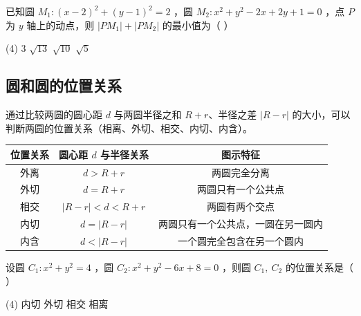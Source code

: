 \begin{example}
    已知圆 $M_1:(x-2)^2+(y-1)^2=2$ ，圆 $M_2: x^2+y^2-2 x+2 y+1=0$ ，点 $P$ 为 $y$ 轴上的动点，则 $|P M_1|+|P M_2|$ 的最小值为（ \hspace{2em} ）
    \begin{tasks}(4)
        \task $3$
        \task $\sqrt{13}$
        \task $\sqrt{10}$
        \task $\sqrt{5}$
    \end{tasks}
\end{example}

\subsection{圆和圆的位置关系}

\begin{theorem}[圆与圆的位置关系]
    通过比较两圆的圆心距 $d$ 与两圆半径之和 $R+r$、半径之差 $|R-r|$ 的大小，可以判断两圆的位置关系（相离、外切、相交、内切、内含）。

    \begin{center}
        \begin{tabular}{|c|c|c|}
            \hline
            位置关系 & 圆心距 $d$ 与半径关系         & 图示特征              \\
            \hline
            外离   & $d > R + r$           & 两圆完全分离            \\
            \hline
            外切   & $d = R + r$           & 两圆只有一个公共点         \\
            \hline
            相交   & $|R - r| < d < R + r$ & 两圆有两个交点           \\
            \hline
            内切   & $d = |R - r|$         & 两圆只有一个公共点，一圆在另一圆内 \\
            \hline
            内含   & $d < |R - r|$         & 一个圆完全包含在另一个圆内     \\
            \hline
        \end{tabular}
    \end{center}
\end{theorem}

\begin{example}
    设圆 $C_1: x^2+y^2=4$ ，圆 $C_2: x^2+y^2-6 x+8=0$ ，则圆 $C_1, ~ C_2$ 的位置关系是（ \hspace{2em} ）
    \begin{tasks}(4)
        \task 内切
        \task 外切
        \task 相交
        \task 相离
    \end{tasks}
\end{example}

